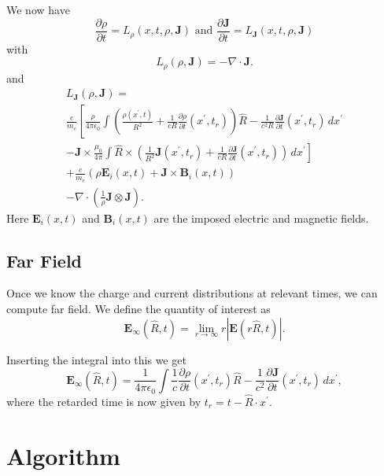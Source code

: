 \documentclass{article}
\newcommand{\abs}[1]{\left\lvert #1 \right\rvert}
\newcommand{\Div}[0]{\nabla\cdot}
\theoremstyle{plain}
\begin{document}
We now have
\begin{equation}
	\frac{\partial\rho}{\partial t} = L_\rho( x,t, \rho, \mathbf{J} )
	\text{ and }
	\frac{\partial\mathbf{J}}{\partial t} = L_{\mathbf{J}}( x,t, \rho, \mathbf{J} )
\end{equation}
with
\begin{equation}
	L_\rho( \rho, \mathbf{J} ) = -\Div\mathbf{J}.
\end{equation}
and
\begin{multline}
	L_{\mathbf{J}}( \rho, \mathbf{J} ) = \\
	\frac{e}{m_e}\left[
	\frac{\rho}{4\pi\epsilon_0} \int
	\left( \frac{\rho(x^{'},t)}{R^2}
	+ \frac{1}{cR}\frac{\partial\rho}{\partial t}(x^{'},t_r)
	\right) \hat{R}
	- \frac{1}{c^2R}\frac{\partial\mathbf{J}}{\partial t}(x^{'},t_r)
	\,dx^{'}\right. \\
	\left.
	-\mathbf{J}\times
	\frac{\mu_0}{4\pi} \int
	\hat{R} \times \left(
	\frac{1}{R^2}\mathbf{J}(x^{'},t_r)
	+ \frac{1}{cR}\frac{\partial\mathbf{J}}{\partial t}(x^{'},t_r)
	\right) \,dx^{'}
	\right]\\
	+ \frac{e}{m_e}\left(
	\rho\mathbf{E}_i(x,t) + \mathbf{J}\times\mathbf{B}_i(x,t)
	\right) \\
	- \Div\left(\frac{1}{\rho}\mathbf{J}\otimes\mathbf{J}\right).
\end{multline}
Here $\mathbf{E}_i(x,t)$ and $\mathbf{B}_i(x,t)$ are the imposed electric and magnetic fields.


\subsection{Far Field}

Once we know the charge and current distributions at relevant times,
we can compute far field.
We define the quantity of interest as
\begin{equation}
	\mathbf{E}_\infty(\hat{R},t) = \lim_{r\rightarrow\infty} r\abs{\mathbf{E}(r\hat{R},t)}.
\end{equation}

Inserting the integral into this we get
\begin{equation}
	\mathbf{E}_\infty(\hat{R},t) = \frac{1}{4\pi\epsilon_0} \int
	\frac{1}{c}\frac{\partial\rho}{\partial t}(x^{'},t_r) \hat{R}
	- \frac{1}{c^2}\frac{\partial\mathbf{J}}{\partial t}(x^{'},t_r)
	\,dx^{'},
\end{equation}
where the retarded time is now given by $t_r = t - \hat{R}\cdot x^{'}$.


\section{Algorithm}

\end{document}
